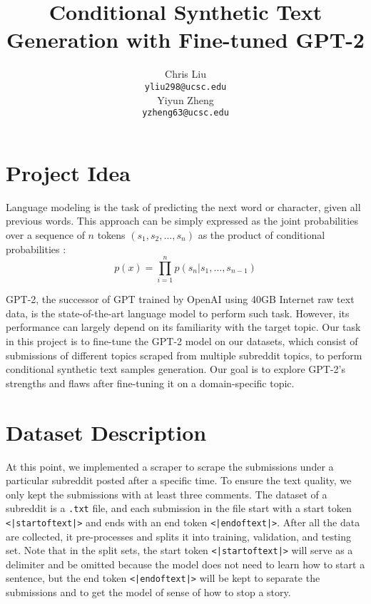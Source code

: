 \documentclass[10pt]{article}
\title{Conditional Synthetic Text Generation with Fine-tuned GPT-2}
\author{
 Chris Liu \\
    \texttt{yliu298@ucsc.edu} \\
 \And
 Yiyun Zheng \\
    \texttt{yzheng63@ucsc.edu}
}
\begin{document}
\maketitle
\section{Project Idea}

Language modeling is the task of predicting the next word or character, given all previous words. This approach can be simply expressed as the joint probabilities over a sequence of $n$ tokens $(s_1, s_2, ... , s_n)$ as the product of conditional probabilities \cite{radford2019language}:
\begin{equation}
   p(x)=\prod_{i=1}^{n} p\left(s_{n} | s_{1}, \dots, s_{n-1}\right)
\end{equation}

GPT-2, the successor of GPT \cite{radford2018improving} trained by OpenAI \cite{radford2019language} using 40GB Internet raw text data, is the state-of-the-art language model to perform such task. However, its performance can largely depend on its familiarity with the target topic. Our task in this project is to fine-tune the GPT-2 model on our datasets, which consist of submissions of different topics scraped from multiple subreddit topics, to perform conditional synthetic text samples generation. Our goal is to explore GPT-2's strengths and flaws after fine-tuning it on a domain-specific topic.

\section{Dataset Description}

At this point, we implemented a scraper to scrape the submissions under a particular subreddit posted after a specific time. To ensure the text quality, we only kept the submissions with at least three comments. The dataset of a subreddit is a \texttt{.txt} file, and each submission in the file start with a start token \texttt{<|startoftext|>} and ends with an end token \texttt{<|endoftext|>}. After all the data are collected, it pre-processes and splits it into training, validation, and testing set. Note that in the split sets, the start token \texttt{<|startoftext|>} will serve as a delimiter and be omitted because the model does not need to learn how to start a sentence, but the end token \texttt{<|endoftext|>} will be kept to separate the submissions and to get the model of sense of how to stop a story.
\end{document}
